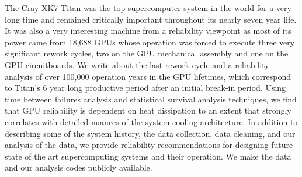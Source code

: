 
The Cray XK7 Titan was the top supercomputer system in the world for a
very long time and remained critically important throughout its nearly
seven year life. It was also a very interesting machine from a
reliability viewpoint as most of its power came from 18,688 GPUs whose
operation was forced to execute three very significant rework cycles,
two on the GPU mechanical assembly and one on the GPU circuitboards. We
write about the last rework cycle and a reliability analysis of over
100,000 operation years in the GPU lifetimes, which correspond to
Titan's 6 year long productive period after an initial break-in
period. Using time between failures analysis and statistical survival
analysis techniques, we find that GPU reliability is dependent on heat
dissipation to an extent that strongly correlates with detailed
nuances of the system cooling architecture. In addition to describing
some of the system history, the data collection, data cleaning, and
our analysis of the data, we provide reliability recommendations for
designing future state of the art supercomputing systems and their
operation. We make the data and our analysis codes publicly available.
